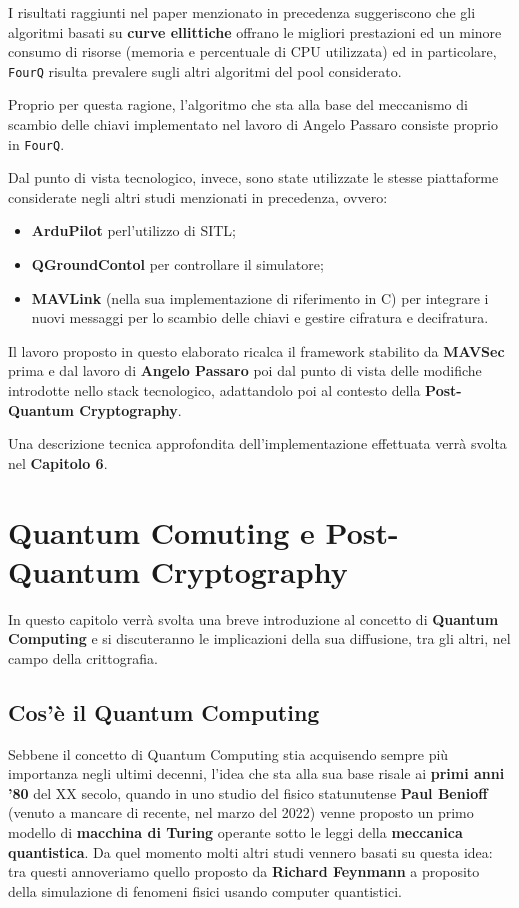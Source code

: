 \documentclass[a4paper, 12pt, oneside]{article}
\theoremstyle{definition}
\begin{document}
I risultati raggiunti nel paper menzionato in precedenza suggeriscono che gli algoritmi basati su \textbf{curve ellittiche} offrano le migliori prestazioni ed un minore consumo di risorse (memoria e percentuale di CPU utilizzata) ed in particolare, \texttt{FourQ} risulta prevalere sugli altri algoritmi del pool considerato.

Proprio per questa ragione, l'algoritmo che sta alla base del meccanismo di scambio delle chiavi implementato nel lavoro di Angelo Passaro consiste proprio in \texttt{FourQ}.

Dal punto di vista tecnologico, invece, sono state utilizzate le stesse piattaforme considerate negli altri studi menzionati in precedenza, ovvero:

\begin{itemize}
    \item \textbf{ArduPilot} perl'utilizzo di SITL;
    \item \textbf{QGroundContol} per controllare il simulatore;
    \item \textbf{MAVLink} (nella sua implementazione di riferimento in C) per integrare i nuovi messaggi per lo scambio delle chiavi e gestire cifratura e decifratura.
\end{itemize}

Il lavoro proposto in questo elaborato ricalca il framework stabilito da \textbf{MAVSec} prima e dal lavoro di \textbf{Angelo Passaro} poi dal punto di vista delle modifiche introdotte nello stack tecnologico, adattandolo poi al contesto della \textbf{Post-Quantum Cryptography}. 

Una descrizione tecnica approfondita dell'implementazione effettuata verrà svolta nel \textbf{Capitolo 6}.

\newpage
\section{Quantum Comuting e Post-Quantum Cryptography}
In questo capitolo verrà svolta una breve introduzione al concetto di \textbf{Quantum Computing} e si discuteranno le implicazioni della sua diffusione, tra gli altri, nel campo della crittografia.

\subsection{Cos'è il Quantum Computing}
Sebbene il concetto di Quantum Computing stia acquisendo sempre più importanza negli ultimi decenni, l'idea che sta alla sua base risale ai \textbf{primi anni '80} del XX secolo, quando in uno studio \cite{Benioff1980} del fisico statunutense \textbf{Paul Benioff} (venuto a mancare di recente, nel marzo del 2022) venne proposto un primo modello di \textbf{macchina di Turing} operante sotto le leggi della \textbf{meccanica quantistica}. Da quel momento molti altri studi vennero basati su questa idea: tra questi annoveriamo quello proposto da \textbf{Richard Feynmann} a proposito della simulazione di fenomeni fisici usando computer quantistici.
\end{document}
